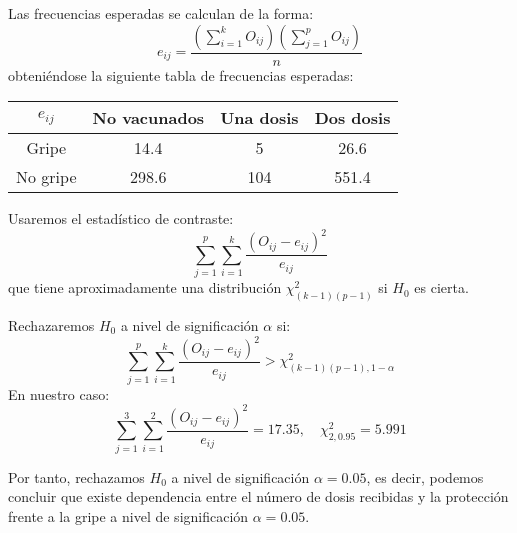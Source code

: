 \begin{example}
    Las frecuencias esperadas se calculan de la forma:
    $$e_{ij} = \frac{(\sum_{i=1}^k O_{ij})(\sum_{j=1}^p O_{ij})}{n}$$
    obteniéndose la siguiente tabla de frecuencias esperadas:
    \begin{center}
        \begin{tabular}{| c | c c c |}
            \hline
            $e_{ij}$ & No vacunados & Una dosis & Dos dosis \\
            \hline
            Gripe    & 14.4         & 5         & 26.6      \\
            No gripe & 298.6        & 104       & 551.4     \\
            \hline
        \end{tabular}
    \end{center}

    Usaremos el estadístico de contraste:
    $$\sum_{j=1}^p \sum_{i=1}^k \frac{(O_{ij}-e_{ij})^2}{e_{ij}}$$
    que tiene aproximadamente una distribución $\chi^2_{(k-1)(p-1)}$ si $H_0$ es cierta.

    Rechazaremos $H_0$ a nivel de significación $\alpha$ si:
    $$\sum_{j=1}^p \sum_{i=1}^k \frac{(O_{ij}-e_{ij})^2}{e_{ij}} > \chi^2_{(k-1)(p-1), 1-\alpha}$$
    En nuestro caso:
    $$\sum_{j=1}^3 \sum_{i=1}^2 \frac{(O_{ij}-e_{ij})^2}{e_{ij}} = 17.35, \quad \chi^2_{2, 0.95} = 5.991$$

    Por tanto, rechazamos $H_0$ a nivel de significación $\alpha = 0.05$, es decir, podemos concluir que existe dependencia entre el número de dosis recibidas y la protección frente a la gripe a nivel de significación $\alpha = 0.05$.
\end{example}

